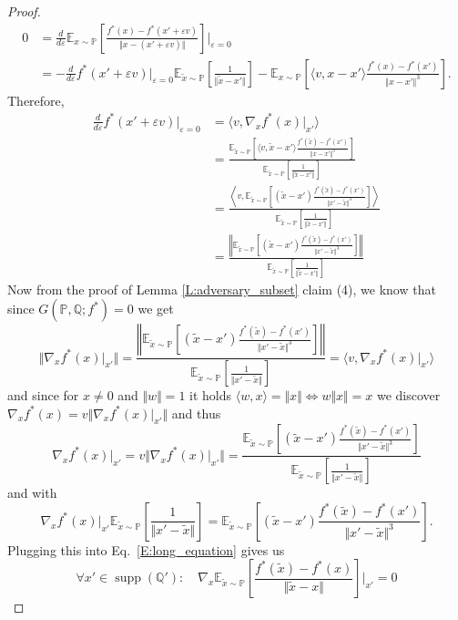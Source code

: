 \documentclass{article}
\DeclareMathOperator{\supp}{supp}
\begin{document}
\begin{proof}
\begin{align*}
 0&=\frac{d}{d\varepsilon}\mathbb E_{x\sim\mathbb P}\left[\frac{f^*(x)-f^*(x'+\varepsilon v)}{\Vert x-(x'+\varepsilon v)\Vert}\right]\bigg|_{\varepsilon=0}\\
 &=-\frac{d}{d\varepsilon}f^*(x'+\varepsilon v)|_{\varepsilon=0}\mathbb E_{\tilde x\sim\mathbb P}\left[\frac{1}{\Vert \tilde x-x'\Vert}\right]
 -\mathbb E_{x\sim\mathbb P}\left[\langle v, x-x'\rangle\frac{f^*(x)-f^*(x')}{\Vert x-x'\Vert^3}\right].
\end{align*}
Therefore,
\begin{align*}
\frac{d}{d\varepsilon}f^*(x'+\varepsilon v)|_{\varepsilon=0} &= \langle v,\nabla_x f^*(x)|_{x'}\rangle \\
&=\frac{\mathbb E_{\tilde x\sim\mathbb P}\left[\langle v, \tilde x-x'\rangle\frac{f^*(\tilde x)-f^*(x')}{\Vert x-x'\Vert^3}\right]}{\mathbb E_{\tilde x\sim\mathbb P}\left[\frac{1}{\Vert \tilde x-x'\Vert}\right]} \\
&=\frac{\left\langle v,\mathbb E_{\tilde x\sim\mathbb P}[(\tilde x- x')\frac{f^*(\tilde x)-f^*(x')}{\Vert x'-\tilde x\Vert^3}]\right\rangle}{\mathbb E_{\tilde x\sim\mathbb P}\left[\frac{1}{\Vert \tilde x-x'\Vert}\right]} \\
&=\frac{\left\Vert\mathbb E_{\tilde x\sim\mathbb P}[(\tilde x- x')\frac{f^*(\tilde x)-f^*(x')}{\Vert x'-\tilde x\Vert^3}]\right\Vert}{\mathbb E_{\tilde x\sim\mathbb P}\left[\frac{1}{\Vert \tilde x-x'\Vert}\right]}
\end{align*}
Now from the proof of Lemma \ref{L:adversary_subset} claim (4), we know that since $G(\mathbb P,\mathbb Q;f^*)=0$ we get
\[\Vert\nabla_x f^*(x)\big|_{x'}\Vert
 =\frac{\left\Vert\mathbb E_{\tilde x\sim\mathbb P}[(\tilde x- x')\frac{f^*(\tilde x)-f^*(x')}{\Vert x'-\tilde x\Vert^3}]\right\Vert}
 {\mathbb E_{\tilde x\sim\mathbb P}[\frac{1}{\Vert x'-\tilde x\Vert}]}
 =\langle v,\nabla_x f^*(x)|_{x'}\rangle\]
and since for $x\not=0$ and $\Vert w\Vert=1$ it holds $\langle w,x\rangle=\Vert x\Vert\Leftrightarrow w\Vert x\Vert=x$ we discover
$\nabla_x f^*(x)=v\Vert\nabla_x f^*(x)\big|_{x'}\Vert$ and thus
\[\nabla_x f^*(x)\big|_{x'}
=v\Vert\nabla_x f^*(x)\big|_{x'}\Vert
=\frac{\mathbb E_{\tilde x\sim\mathbb P}\left[(\tilde x- x')\frac{f^*(\tilde x)-f^*(x')}{\Vert x'-\tilde x\Vert^3}\right]}
 {\mathbb E_{\tilde x\sim\mathbb P}[\frac{1}{\Vert x'-\tilde x\Vert}]}\]
and with 
\[\nabla_x f^*(x)\big|_{x'}\mathbb E_{\tilde x\sim\mathbb P}[\frac{1}{\Vert x'-\tilde x\Vert}] = \mathbb E_{\tilde x\sim\mathbb P}\left[(\tilde x- x')\frac{f^*(\tilde x)-f^*(x')}{\Vert x'-\tilde x\Vert^3}\right].\]
Plugging this into Eq.\ \ref{E:long_equation} gives us
\[\forall x'\in\supp(\mathbb Q'):\quad \nabla_x\mathbb E_{\tilde x\sim\mathbb P}\left[\frac{f^*(\tilde x)-f^*(x)}{\Vert \tilde x - x\Vert}\right]\bigg|_{x'}=0\]
\end{proof}
\end{document}
